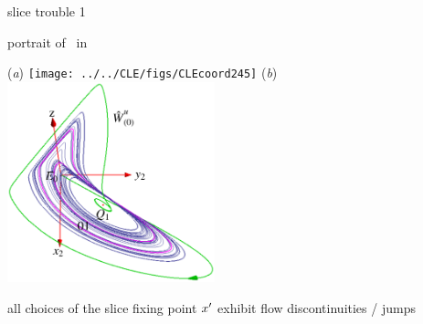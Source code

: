 \documentclass{beamer}
\begin{document}
\begin{frame}{slice trouble 1}
\begin{block}{portrait of \cLf\ in \reducedsp}
\begin{center}
(\textit{a})
  \texttt{[image: ../../CLE/figs/CLEcoord245]}
(\textit{b})
  \includegraphics[width=0.45\textwidth,clip=true]
  {../../figs/CLEperpReqb}
\end{center}
\end{block}
all choices of the slice fixing point ${x'}$
exhibit flow discontinuities / jumps
\end{frame}
\end{document}
